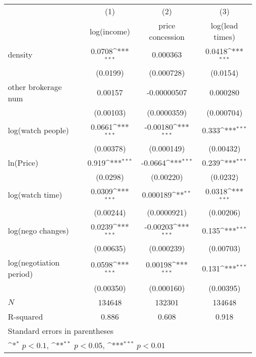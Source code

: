{
\def\sym#1{\ifmmode^{#1}\else\(^{#1}\)\fi}
\begin{tabular}{l*{3}{c}}
\toprule
            &\multicolumn{1}{c}{(1)}&\multicolumn{1}{c}{(2)}&\multicolumn{1}{c}{(3)}\\
            &\multicolumn{1}{c}{log(income)}&\multicolumn{1}{c}{price concession}&\multicolumn{1}{c}{log(lead times)}\\
\midrule
density     &      0.0708\sym{***}&    0.000363         &      0.0418\sym{***}\\
            &    (0.0199)         &  (0.000728)         &    (0.0154)         \\
\addlinespace
other brokerage num  &     0.00157         & -0.00000507         &    0.000280         \\
            &   (0.00103)         & (0.0000359)         &  (0.000704)         \\
\addlinespace
log(watch people)&      0.0661\sym{***}&    -0.00180\sym{***}&       0.333\sym{***}\\
            &   (0.00378)         &  (0.000149)         &   (0.00432)         \\
\addlinespace
ln(Price)&       0.919\sym{***}&     -0.0664\sym{***}&       0.239\sym{***}\\
            &    (0.0298)         &   (0.00220)         &    (0.0232)         \\
\addlinespace
log(watch time)&      0.0309\sym{***}&    0.000189\sym{**} &      0.0318\sym{***}\\
            &   (0.00244)         & (0.0000921)         &   (0.00206)         \\
\addlinespace
log(nego changes)&      0.0239\sym{***}&    -0.00203\sym{***}&       0.135\sym{***}\\
            &   (0.00635)         &  (0.000239)         &   (0.00703)         \\
\addlinespace
log(negotiation period)&      0.0598\sym{***}&     0.00198\sym{***}&       0.131\sym{***}\\
            &   (0.00350)         &  (0.000160)         &   (0.00395)         \\
\midrule
\(N\)       &      134648         &      132301         &      134648         \\
R-squared   &       0.886         &       0.608         &       0.918         \\
\bottomrule
\multicolumn{4}{l}{\footnotesize Standard errors in parentheses}\\
\multicolumn{4}{l}{\footnotesize \sym{*} \(p<0.1\), \sym{**} \(p<0.05\), \sym{***} \(p<0.01\)}\\
\end{tabular}
}

